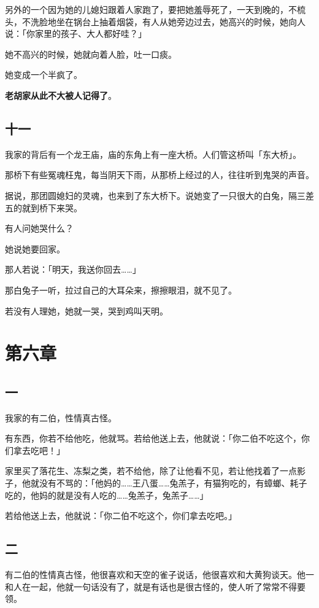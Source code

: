 \documentclass[UTF8]{ctexart}
\begin{document}
另外的一个因为她的儿媳妇跟着人家跑了，要把她羞辱死了，一天到晚的，不梳头，不洗脸地坐在锅台上抽着烟袋，有人从她旁边过去，她高兴的时候，她向人说：「你家里的孩子、大人都好哇？」

她不高兴的时候，她就向着人脸，吐一口痰。

她变成一个半疯了。

\textbf{老胡家从此不大被人记得了}。

\subsection{十一}

我家的背后有一个龙王庙，庙的东角上有一座大桥。人们管这桥叫「东大桥」。

那桥下有些冤魂枉鬼，每当阴天下雨，从那桥上经过的人，往往听到鬼哭的声音。

据说，那团圆媳妇的灵魂，也来到了东大桥下。说她变了一只很大的白兔，隔三差五的就到桥下来哭。

有人问她哭什么？

她说她要回家。

那人若说：「明天，我送你回去……」

那白兔子一听，拉过自己的大耳朵来，擦擦眼泪，就不见了。

若没有人理她，她就一哭，哭到鸡叫天明。

\section{第六章}

\subsection{一}

我家的有二伯，性情真古怪。

有东西，你若不给他吃，他就骂。若给他送上去，他就说：「你二伯不吃这个，你们拿去吃吧！」

家里买了落花生、冻梨之类，若不给他，除了让他看不见，若让他找着了一点影子，他就没有不骂的：「他妈的……王八蛋……兔羔子，有猫狗吃的，有蟑螂、耗子吃的，他妈的就是没有人吃的……兔羔子，兔羔子……」

若给他送上去，他就说：「你二伯不吃这个，你们拿去吃吧。」

\subsection{二}

有二伯的性情真古怪，他很喜欢和天空的雀子说话，他很喜欢和大黄狗谈天。他一和人在一起，他就一句话没有了，就是有话也是很古怪的，使人听了常常不得要领。
\end{document}

